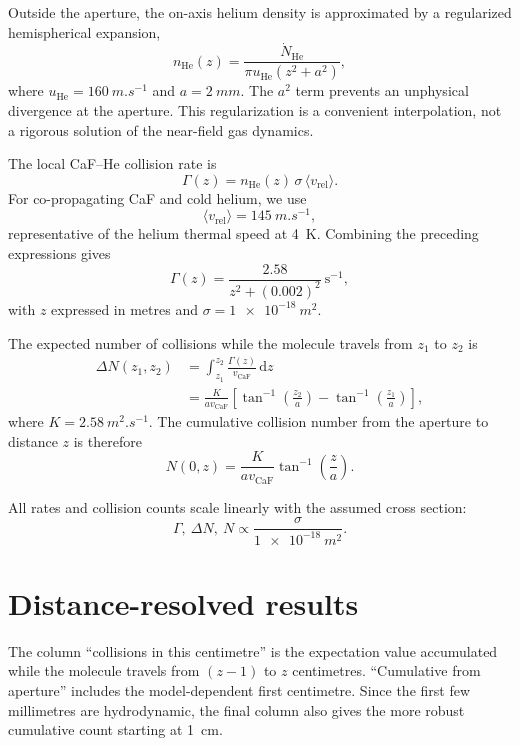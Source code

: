 \documentclass[11pt,a4paper]{article}
\begin{document}
Outside the aperture, the on-axis helium density is approximated by a regularized hemispherical expansion,
\begin{equation}
 n_{\mathrm{He}}(z)=
 \frac{\dot N_{\mathrm{He}}}
 {\pi u_{\mathrm{He}}\left(z^2+a^2\right)},
\end{equation}
where $u_{\mathrm{He}}=\SI{160}{m.s^{-1}}$ and $a=\SI{2}{mm}$. The $a^2$ term prevents an unphysical divergence at the aperture. This regularization is a convenient interpolation, not a rigorous solution of the near-field gas dynamics.

The local CaF--He collision rate is
\begin{equation}
 \Gamma(z)=n_{\mathrm{He}}(z)\,\sigma\,\langle v_{\mathrm{rel}}\rangle.
\end{equation}
For co-propagating CaF and cold helium, we use
\begin{equation}
 \langle v_{\mathrm{rel}}\rangle=\SI{145}{m.s^{-1}},
\end{equation}
representative of the helium thermal speed at \SI{4}{K}. Combining the preceding expressions gives
\begin{equation}
 \boxed{\Gamma(z)=\frac{2.58}{z^2+(0.002)^2}\ \mathrm{s^{-1}}},
\end{equation}
with $z$ expressed in metres and $\sigma=\SI{1e-18}{m^2}$.

The expected number of collisions while the molecule travels from $z_1$ to $z_2$ is
\begin{align}
 \Delta N(z_1,z_2)
 &=\int_{z_1}^{z_2}\frac{\Gamma(z)}{v_{\mathrm{CaF}}}\,\mathrm{d}z \\
 &=\frac{K}{a v_{\mathrm{CaF}}}
 \left[
 \tan^{-1}\!\left(\frac{z_2}{a}\right)
 -\tan^{-1}\!\left(\frac{z_1}{a}\right)
 \right],
\end{align}
where $K=\SI{2.58}{m^2.s^{-1}}$. The cumulative collision number from the aperture to distance $z$ is therefore
\begin{equation}
 \boxed{N(0,z)=\frac{K}{a v_{\mathrm{CaF}}}
 \tan^{-1}\!\left(\frac{z}{a}\right)}.
\end{equation}

All rates and collision counts scale linearly with the assumed cross section:
\begin{equation}
 \Gamma,\ \Delta N,\ N \propto
 \frac{\sigma}{\SI{1e-18}{m^2}}.
\end{equation}

\section{Distance-resolved results}
The column ``collisions in this centimetre'' is the expectation value accumulated while the molecule travels from $(z-1)$ to $z$ centimetres. ``Cumulative from aperture'' includes the model-dependent first centimetre. Since the first few millimetres are hydrodynamic, the final column also gives the more robust cumulative count starting at \SI{1}{cm}.
\end{document}
